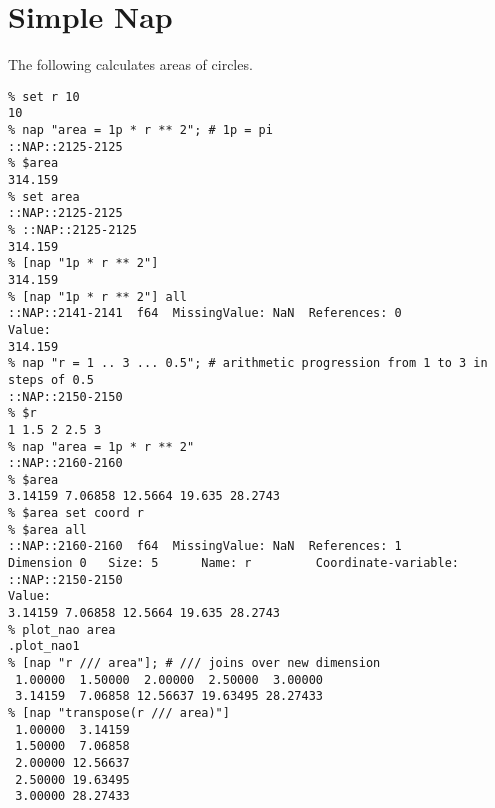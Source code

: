 
\section{Simple Nap}

  The following calculates areas of circles.
  \begin{verbatim}
% set r 10
10
% nap "area = 1p * r ** 2"; # 1p = pi
::NAP::2125-2125
% $area
314.159
% set area
::NAP::2125-2125
% ::NAP::2125-2125
314.159
% [nap "1p * r ** 2"]
314.159
% [nap "1p * r ** 2"] all
::NAP::2141-2141  f64  MissingValue: NaN  References: 0
Value:
314.159
% nap "r = 1 .. 3 ... 0.5"; # arithmetic progression from 1 to 3 in steps of 0.5
::NAP::2150-2150
% $r
1 1.5 2 2.5 3
% nap "area = 1p * r ** 2"
::NAP::2160-2160
% $area
3.14159 7.06858 12.5664 19.635 28.2743
% $area set coord r
% $area all
::NAP::2160-2160  f64  MissingValue: NaN  References: 1
Dimension 0   Size: 5      Name: r         Coordinate-variable: ::NAP::2150-2150
Value:
3.14159 7.06858 12.5664 19.635 28.2743
% plot_nao area
.plot_nao1
% [nap "r /// area"]; # /// joins over new dimension
 1.00000  1.50000  2.00000  2.50000  3.00000
 3.14159  7.06858 12.56637 19.63495 28.27433
% [nap "transpose(r /// area)"]
 1.00000  3.14159
 1.50000  7.06858
 2.00000 12.56637
 2.50000 19.63495
 3.00000 28.27433
\end{verbatim}

